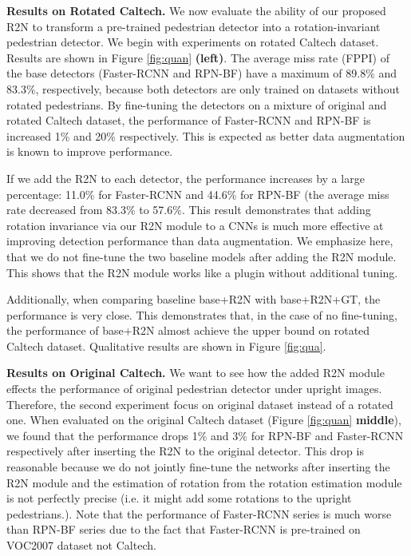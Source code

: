 \documentclass[10pt,twocolumn,letterpaper]{article}
\begin{document}
\vspace{1mm}
\noindent\textbf{Results on Rotated Caltech.} We now evaluate the ability of our proposed R2N to transform a pre-trained pedestrian detector into a rotation-invariant pedestrian detector. We begin with experiments on rotated Caltech dataset. Results are shown in Figure \ref{fig:quan} \textbf{(left)}. The average miss rate (FPPI) of the base detectors (Faster-RCNN and RPN-BF) have a maximum of 89.8\% and 83.3\%, respectively, because both detectors are only trained on datasets without rotated pedestrians. By fine-tuning the detectors on a mixture of original and rotated Caltech dataset, the performance of Faster-RCNN and RPN-BF is increased 1\% and 20\% respectively. This is expected as better data augmentation is known to improve performance. 

If we add the R2N to each detector, the performance increases by a large percentage: 11.0\% for Faster-RCNN and 44.6\% for RPN-BF (the average miss rate decreased from 83.3\% to 57.6\%. This result demonstrates that adding rotation invariance via our R2N module to a CNNs is much more effective at improving detection performance than data augmentation. We emphasize here, that we do not fine-tune the two baseline models after adding the R2N module. This shows that the R2N module works like a plugin without additional tuning. 


Additionally, when comparing baseline base+R2N with base+R2N+GT, the performance is very close. This demonstrates that, in the case of no fine-tuning, the performance of base+R2N almost achieve the upper bound on rotated Caltech dataset. Qualitative results are shown in Figure \ref{fig:qua}.

\noindent\textbf{Results on Original Caltech.} We want to see how the added R2N module effects the performance of original pedestrian detector under upright images. Therefore, the second experiment focus on original dataset instead of a rotated one. When evaluated on the original Caltech dataset (Figure \ref{fig:quan} \textbf{middle}), we found that the performance drops 1\% and 3\% for RPN-BF and Faster-RCNN respectively after inserting the R2N to the original detector. This drop is reasonable because we do not jointly fine-tune the networks after inserting the R2N module and the estimation of rotation from the rotation estimation module is not perfectly precise (i.e. it might add some rotations to the upright pedestrians.). Note that the performance of Faster-RCNN series is much worse than RPN-BF series due to the fact that Faster-RCNN is pre-trained on VOC2007 dataset not Caltech.
\end{document}
